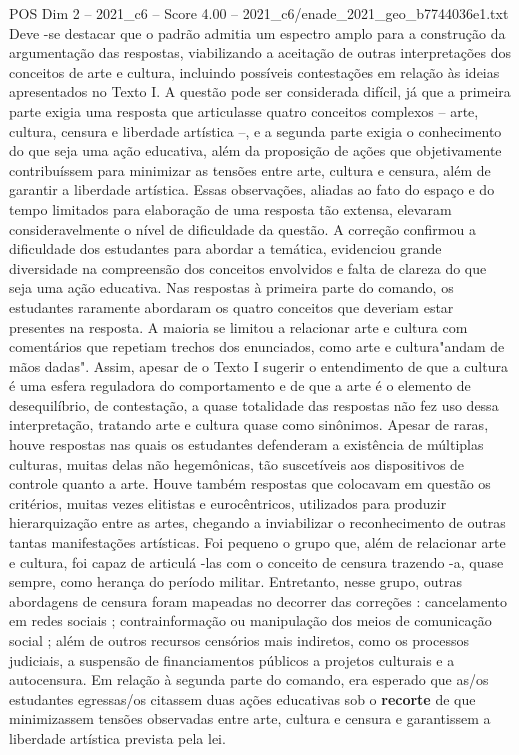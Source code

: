 \begin{textsample}{POS Dim 2 – 2021\_c6 – Score 4.00 – 2021\_c6/enade\_2021\_geo\_b7744036e1.txt}
Deve -se destacar que o padrão admitia um espectro amplo para a construção da argumentação das respostas, viabilizando a aceitação de outras interpretações dos conceitos de arte e cultura, incluindo possíveis contestações em relação às ideias apresentados no Texto I.
A questão pode ser considerada difícil, já que a primeira parte exigia uma resposta que articulasse quatro conceitos complexos – arte, cultura, censura e liberdade artística –, e a segunda parte exigia o conhecimento do que seja uma ação educativa, além da proposição de ações que objetivamente contribuíssem para minimizar as tensões entre arte, cultura e censura, além de garantir a liberdade artística.
Essas observações, aliadas ao fato do espaço e do tempo limitados para elaboração de uma resposta tão extensa, elevaram consideravelmente o nível de dificuldade da questão.
A correção confirmou a dificuldade dos estudantes para abordar a temática, evidenciou grande diversidade na compreensão dos conceitos envolvidos e falta de clareza do que seja uma ação educativa.
Nas respostas à primeira parte do comando, os estudantes raramente abordaram os quatro conceitos que deveriam estar presentes na resposta.
A maioria se limitou a relacionar arte e cultura com comentários que repetiam trechos dos enunciados, como arte e cultura"andam de mãos dadas".
Assim, apesar de o Texto I sugerir o entendimento de que a cultura é uma esfera reguladora do comportamento e de que a arte é o elemento de desequilíbrio, de contestação, a quase totalidade das respostas não fez uso dessa interpretação, tratando arte e cultura quase como sinônimos.
Apesar de raras, houve respostas nas quais os estudantes defenderam a existência de múltiplas culturas, muitas delas não hegemônicas, tão suscetíveis aos dispositivos de controle quanto a arte.
Houve também respostas que colocavam em questão os critérios, muitas vezes elitistas e eurocêntricos, utilizados para produzir hierarquização entre as artes, chegando a inviabilizar o reconhecimento de outras tantas manifestações artísticas.
Foi pequeno o grupo que, além de relacionar arte e cultura, foi capaz de articulá -las com o conceito de censura trazendo -a, quase sempre, como herança do período militar.
Entretanto, nesse grupo, outras abordagens de censura foram mapeadas no decorrer das correções : cancelamento em redes sociais ; contrainformação ou manipulação dos meios de comunicação social ; além de outros recursos censórios mais indiretos, como os processos judiciais, a suspensão de financiamentos públicos a projetos culturais e a autocensura.
Em relação à segunda parte do comando, era esperado que as/os estudantes egressas/os citassem duas ações educativas sob o \textbf{recorte} de que minimizassem tensões observadas entre arte, cultura e censura e garantissem a liberdade artística prevista pela lei.

\end{textsample}
